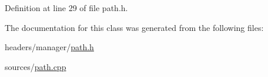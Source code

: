 Definition at line 29 of file path.\-h.



The documentation for this class was generated from the following files\-:\begin{DoxyCompactItemize}
\item 
headers/manager/\hyperlink{path_8h}{path.\-h}\item 
sources/\hyperlink{path_8cpp}{path.\-cpp}\end{DoxyCompactItemize}

